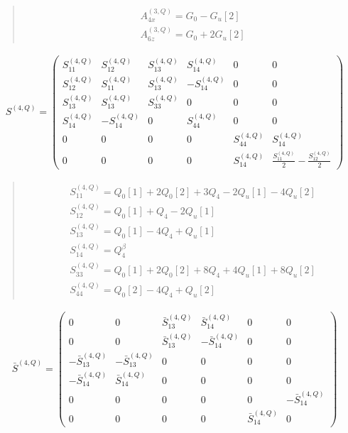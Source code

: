\documentclass[fleqn,10pt]{jsarticle}
\begin{document}
\begin{quote}
\begin{align*}
& A^{(3,Q)}_{4x} = G_{0} - G_{u}[2] \\
& A^{(3,Q)}_{6z} = G_{0} + 2 G_{u}[2]
\end{align*}
\end{quote}
\begin{align*}
S^{(4,Q)} = \begin{pmatrix} S^{(4,Q)}_{11} & S^{(4,Q)}_{12} & S^{(4,Q)}_{13} & S^{(4,Q)}_{14} & 0 & 0 \\ S^{(4,Q)}_{12} & S^{(4,Q)}_{11} & S^{(4,Q)}_{13} & - S^{(4,Q)}_{14} & 0 & 0 \\ S^{(4,Q)}_{13} & S^{(4,Q)}_{13} & S^{(4,Q)}_{33} & 0 & 0 & 0 \\ S^{(4,Q)}_{14} & - S^{(4,Q)}_{14} & 0 & S^{(4,Q)}_{44} & 0 & 0 \\ 0 & 0 & 0 & 0 & S^{(4,Q)}_{44} & S^{(4,Q)}_{14} \\ 0 & 0 & 0 & 0 & S^{(4,Q)}_{14} & \frac{S^{(4,Q)}_{11}}{2} - \frac{S^{(4,Q)}_{12}}{2} \end{pmatrix}
\end{align*}
\begin{quote}
\begin{align*}
& S^{(4,Q)}_{11} = Q_{0}[1] + 2 Q_{0}[2] + 3 Q_{4} - 2 Q_{u}[1] - 4 Q_{u}[2] \\
& S^{(4,Q)}_{12} = Q_{0}[1] + Q_{4} - 2 Q_{u}[1] \\
& S^{(4,Q)}_{13} = Q_{0}[1] - 4 Q_{4} + Q_{u}[1] \\
& S^{(4,Q)}_{14} = Q_{4}^{\beta} \\
& S^{(4,Q)}_{33} = Q_{0}[1] + 2 Q_{0}[2] + 8 Q_{4} + 4 Q_{u}[1] + 8 Q_{u}[2] \\
& S^{(4,Q)}_{44} = Q_{0}[2] - 4 Q_{4} + Q_{u}[2]
\end{align*}
\end{quote}
\begin{align*}
\bar{S}^{(4,Q)} = \begin{pmatrix} 0 & 0 & \bar{S}^{(4,Q)}_{13} & \bar{S}^{(4,Q)}_{14} & 0 & 0 \\ 0 & 0 & \bar{S}^{(4,Q)}_{13} & - \bar{S}^{(4,Q)}_{14} & 0 & 0 \\ - \bar{S}^{(4,Q)}_{13} & - \bar{S}^{(4,Q)}_{13} & 0 & 0 & 0 & 0 \\ - \bar{S}^{(4,Q)}_{14} & \bar{S}^{(4,Q)}_{14} & 0 & 0 & 0 & 0 \\ 0 & 0 & 0 & 0 & 0 & - \bar{S}^{(4,Q)}_{14} \\ 0 & 0 & 0 & 0 & \bar{S}^{(4,Q)}_{14} & 0 \end{pmatrix}
\end{align*}
\end{document}
